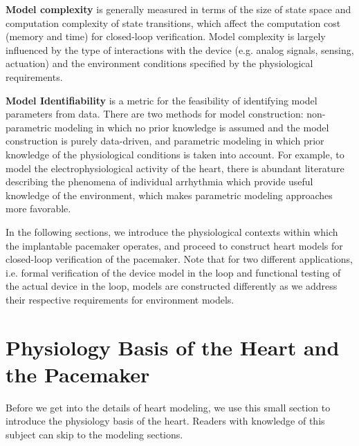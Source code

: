\textbf{Model complexity} is generally measured in terms of the size of state space and computation complexity of state transitions, which affect the computation cost (memory and time) for closed-loop verification. Model complexity is largely influenced by the type of interactions with the device (e.g. analog signals, sensing, actuation) and the environment conditions specified by the physiological requirements. 

\textbf{Model Identifiability} is a metric for the feasibility of identifying model parameters from data. There are two methods for model construction: non-parametric modeling in which no prior knowledge is assumed and the model construction is purely data-driven, and parametric modeling in which prior knowledge of the physiological conditions is taken into account. For example, to model the electrophysiological activity of the heart, there is abundant literature describing the phenomena of individual arrhythmia which provide useful knowledge of the environment, which makes parametric modeling approaches more favorable.



In the following sections, we introduce the physiological contexts within which the implantable pacemaker operates, and proceed to construct heart models for closed-loop verification of the pacemaker. Note that for two different applications, i.e. formal verification of the device model in the loop and functional testing of the actual device in the loop, models are constructed differently as we address their respective requirements for environment models. 

\section{Physiology Basis of the Heart and the Pacemaker}
Before we get into the details of heart modeling, we use this small section to introduce the physiology basis of the heart. Readers with knowledge of this subject can skip to the modeling sections.

